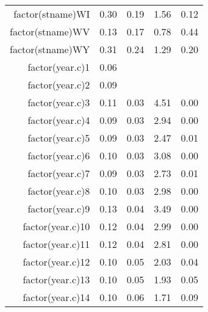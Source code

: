 \begin{table}[ht]
\begin{tabular}{rrrrr}
  factor(stname)WI & 0.30 & 0.19 & 1.56 & 0.12 \\ 
  factor(stname)WV & 0.13 & 0.17 & 0.78 & 0.44 \\ 
  factor(stname)WY & 0.31 & 0.24 & 1.29 & 0.20 \\ 
  factor(year.c)1 & 0.06 &  &  &  \\ 
  factor(year.c)2 & 0.09 &  &  &  \\ 
  factor(year.c)3 & 0.11 & 0.03 & 4.51 & 0.00 \\ 
  factor(year.c)4 & 0.09 & 0.03 & 2.94 & 0.00 \\ 
  factor(year.c)5 & 0.09 & 0.03 & 2.47 & 0.01 \\ 
  factor(year.c)6 & 0.10 & 0.03 & 3.08 & 0.00 \\ 
  factor(year.c)7 & 0.09 & 0.03 & 2.73 & 0.01 \\ 
  factor(year.c)8 & 0.10 & 0.03 & 2.98 & 0.00 \\ 
  factor(year.c)9 & 0.13 & 0.04 & 3.49 & 0.00 \\ 
  factor(year.c)10 & 0.12 & 0.04 & 2.99 & 0.00 \\ 
  factor(year.c)11 & 0.12 & 0.04 & 2.81 & 0.00 \\ 
  factor(year.c)12 & 0.10 & 0.05 & 2.03 & 0.04 \\ 
  factor(year.c)13 & 0.10 & 0.05 & 1.93 & 0.05 \\ 
  factor(year.c)14 & 0.10 & 0.06 & 1.71 & 0.09 \\ 
   \hline
\end{tabular}
\end{table}

